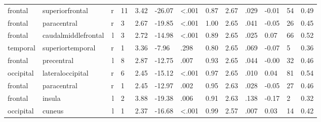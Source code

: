 \documentclass{article}
\begin{document}
\begin{longtable}{llrR{1.3cm}R{1cm}R{1.3cm}R{1cm}R{1cm}R{1.3cm}R{1cm}R{1.8cm}R{1.3cm}R{1.8cm}}
   frontal &           superiorfrontal &    r &        11 &                  3.42 &           -26.07 &      \textless.001 &                               0.87 &                          2.67 &                            .029 &  -0.01 &     54 &      0.49 \\
   frontal &               paracentral &    r &         3 &                  2.67 &           -19.85 &      \textless.001 &                               1.00 &                          2.65 &                            .041 &  -0.05 &     26 &      0.45 \\
   frontal &       caudalmiddlefrontal &    l &         3 &                  2.72 &           -14.98 &      \textless.001 &                               0.89 &                          2.65 &                            .025 &   0.07 &     66 &      0.52 \\
  temporal &          superiortemporal &    r &         1 &                  3.36 &            -7.96 &               .298 &                               0.80 &                          2.65 &                            .069 &  -0.07 &      5 &      0.36 \\
   frontal &                precentral &    l &         8 &                  2.87 &           -12.75 &               .007 &                               0.93 &                          2.65 &                            .044 &  -0.00 &     32 &      0.46 \\
 occipital &          lateraloccipital &    r &         6 &                  2.45 &           -15.12 &      \textless.001 &                               0.97 &                          2.65 &                            .010 &   0.04 &     81 &      0.54 \\
   frontal &               paracentral &    r &         1 &                  2.45 &           -12.97 &               .002 &                               0.95 &                          2.63 &                            .028 &  -0.05 &     27 &      0.46 \\
   frontal &                    insula &    l &         2 &                  3.88 &           -19.38 &               .006 &                               0.91 &                          2.63 &                            .138 &  -0.17 &      2 &      0.32 \\
 occipital &                    cuneus &    l &         1 &                  2.37 &           -16.68 &      \textless.001 &                               0.99 &                          2.57 &                            .007 &   0.03 &     14 &      0.42 \\

\end{longtable}
\end{document}
